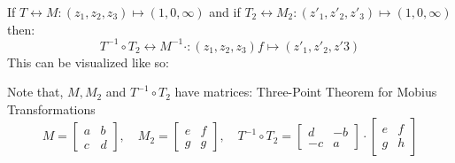 \documentclass[a4paper, 10pt ]{article} %
\theoremstyle{definition}
\theoremstyle{plain}
\begin{document}
\begin{theorembox}
  \footnotesize If $T \longleftrightarrow M : (z_1, z_2, z_3) \mapsto (1,0,\infty)$ and if $T_2 \longleftrightarrow M_2: (z'_1, z'_2, z'_3) \mapsto (1,0,\infty)$ then:
  $$T^{-1} \circ T_2 \longleftrightarrow M^{-1} \cdot: (z_1, z_2, z_3) f\mapsto (z'_1, z'_2, z'3) $$
  This can be visualized like so:
  \begin{center}
  \end{center}
  Note that, $M, M_2$ and $T^{-1}\circ T_2$ have matrices: Three-Point Theorem for Mobius Transformations
  $$M = \begin{bmatrix} a&b \\ c &d \end{bmatrix}, \quad M_2 = \begin{bmatrix} e&f \\ g &g \end{bmatrix}, \quad T^{-1} \circ T_2 =  \begin{bmatrix} d&-b \\ -c &a \end{bmatrix} \cdot \begin{bmatrix}e & f \\ g & h\end{bmatrix}$$
\end{theorembox}
\end{document}
